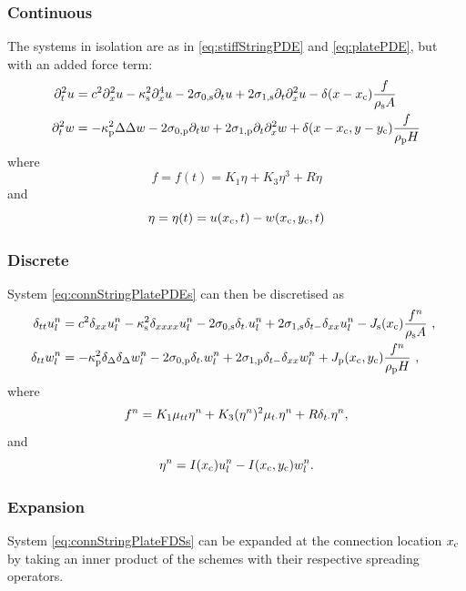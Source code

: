 \subsubsection{Continuous}
The systems in isolation are as in \eqref{eq:stiffStringPDE} and \eqref{eq:platePDE}, but with an added force term:
\begin{subequations}\label{eq:connStringPlatePDEs}
\begin{align}
    \ptt u &= c^2 \pxx u - \kappa_\stxt^2 \pxxxx u - 2\szX[,\stxt]\pt u + 2\soX[,\stxt] \pt\pxx u - \delta(x-x_\ctxt)\frac{f}{\rho_\stxt A}\\
   \ptt w &= -\kappa_\ptxt^2\Delta\Delta w - 2\szX[,\ptxt]\pt w + 2\soX[,\ptxt] \pt\pxx w + \delta(x-x_\ctxt, y-y_\ctxt)\frac{f}{ \rho_\ptxt H}
\end{align}
\end{subequations}
where
\begin{equation}
    f = f(t) = K_1\eta+K_3\eta^3+R \dot\eta
\end{equation}
and
\begin{equation}
    \eta = \eta(t) = u(x_{\text{c}}, t) - w(x_{\text{c}}, y_{\text{c}}, t)
\end{equation}

\subsubsection{Discrete}
System \eqref{eq:connStringPlatePDEs} can then be discretised as
\begin{align}\label{eq:connStringPlateFDSs}
    \!\!\!\dtt \uln &= c^2 \dxx \uln - \kappa_\stxt^2 \dxxxx \uln - 2\szX[,\stxt]\dtd \uln + 2\soX[,\stxt] \dtm\dxx \uln - J_\stxt(x_\ctxt)\frac{f^n}{\rho_\stxt A}\ ,\\
    \!\!\!\dtt \wln &= -\kappa_\ptxt^2\dTwoD\dTwoD \wln - 2\szX[,\ptxt]\dtd \wln + 2\soX[,\ptxt] \dtm\dxx \wln + J_\ptxt(x_\ctxt, y_\ctxt)\frac{f^n}{ \rho_\ptxt H}\ ,
\end{align}
where
\begin{equation}
    f^n = K_1\mu_{tt}\eta^n+K_3(\eta^n)^2\mu_{t\cdot}\eta^n+R\delta_{t\cdot}\eta^n,
\end{equation}
and
\begin{equation}
    \eta^n = I(x_{\text{c}})u_l^n - I(x_{\text{c}}, y_{\text{c}})w_l^n.
\end{equation}

\subsubsection{Expansion}
System \eqref{eq:connStringPlateFDSs} can be expanded at the connection location $x_{\text{c}}$ by taking an inner product of the schemes with their respective spreading operators. 


